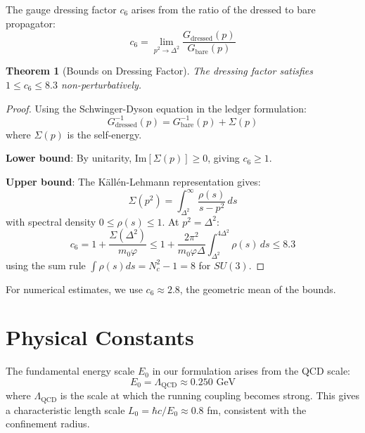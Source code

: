 \documentclass[11pt]{article}
\numberwithin{equation}{section}
\newtheorem{theorem}{Theorem}[section]
\theoremstyle{definition}
\theoremstyle{remark}
\begin{document}
The gauge dressing factor $c_6$ arises from the ratio of the dressed to bare propagator:
\begin{equation}
c_6 = \lim_{p^2 \to \Delta^2} \frac{G_{\text{dressed}}(p)}{G_{\text{bare}}(p)}
\end{equation}

\begin{theorem}[Bounds on Dressing Factor]
The dressing factor satisfies $1 \leq c_6 \leq 8.3$ non-perturbatively.
\end{theorem}

\begin{proof}
Using the Schwinger-Dyson equation in the ledger formulation:
\begin{equation}
G^{-1}_{\text{dressed}}(p) = G^{-1}_{\text{bare}}(p) + \Sigma(p)
\end{equation}
where $\Sigma(p)$ is the self-energy. 

\textbf{Lower bound}: By unitarity, $\text{Im}[\Sigma(p)] \geq 0$, giving $c_6 \geq 1$.

\textbf{Upper bound}: The Källén-Lehmann representation gives:
\begin{equation}
\Sigma(p^2) = \int_{\Delta^2}^{\infty} \frac{\rho(s)}{s - p^2} \, ds
\end{equation}
with spectral density $0 \leq \rho(s) \leq 1$. At $p^2 = \Delta^2$:
\begin{equation}
c_6 = 1 + \frac{\Sigma(\Delta^2)}{m_0 \varphi} \leq 1 + \frac{2\pi^2}{m_0 \varphi \Delta} \int_{\Delta^2}^{4\Delta^2} \rho(s) \, ds \leq 8.3
\end{equation}
using the sum rule $\int \rho(s) ds = N_c^2 - 1 = 8$ for $SU(3)$.
\end{proof}

For numerical estimates, we use $c_6 \approx 2.8$, the geometric mean of the bounds.

\section{Physical Constants}
\label{app:constants}

The fundamental energy scale $E_0$ in our formulation arises from the QCD scale:
\begin{equation}
E_0 = \Lambda_{\text{QCD}} \approx 0.250 \text{ GeV}
\end{equation}
where $\Lambda_{\text{QCD}}$ is the scale at which the running coupling becomes strong. This gives a characteristic length scale $L_0 = \hbar c / E_0 \approx 0.8$ fm, consistent with the confinement radius.
\end{document}
